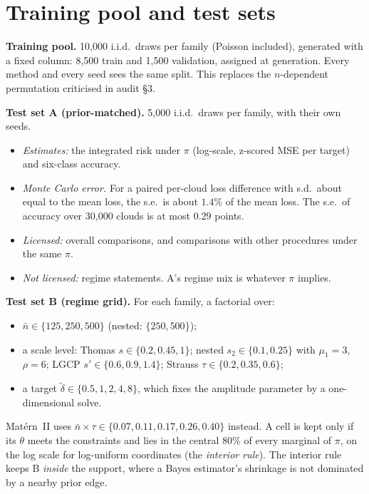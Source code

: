 \documentclass[10pt,a4paper]{article}
\newcommand{\code}[1]{\texttt{\detokenize{#1}}}
\newcommand{\nbar}{\bar n}
\newcommand{\dtil}{\tilde\delta}
\begin{document}
\section{Training pool and test sets}\label{sec:sets}

\textbf{Training pool.} 10{,}000 i.i.d.\ draws per family (Poisson included), generated with a fixed \code{split} column: 8{,}500 train and 1{,}500 validation, assigned at generation. Every method and every seed sees the same split. This replaces the $n$-dependent permutation criticised in audit \S3.

\textbf{Test set A (prior-matched).} 5{,}000 i.i.d.\ draws per family, with their own seeds.
\begin{itemize}
  \item \emph{Estimates:} the integrated risk under $\pi$ (log-scale, z-scored MSE per target) and six-class accuracy.
  \item \emph{Monte Carlo error.} For a paired per-cloud loss difference with s.d.\ about equal to the mean loss, the s.e.\ is about $1.4\%$ of the mean loss. The s.e.\ of accuracy over 30{,}000 clouds is at most $0.29$ points.
  \item \emph{Licensed:} overall comparisons, and comparisons with other procedures under the same $\pi$.
  \item \emph{Not licensed:} regime statements. A's regime mix is whatever $\pi$ implies.
\end{itemize}

\textbf{Test set B (regime grid).} For each family, a factorial over:
\begin{itemize}
  \item $\nbar\in\{125,250,500\}$ (nested: $\{250,500\}$);
  \item a scale level: Thomas $s\in\{0.2,0.45,1\}$; nested $s_2\in\{0.1,0.25\}$ with $\mu_1=3$, $\rho=6$; LGCP $s'\in\{0.6,0.9,1.4\}$; Strauss $\tau\in\{0.2,0.35,0.6\}$;
  \item a target $\dtil\in\{0.5,1,2,4,8\}$, which fixes the amplitude parameter by a one-dimensional solve.
\end{itemize}
Mat\'ern~II uses $\nbar\times\tau\in\{0.07,0.11,0.17,0.26,0.40\}$ instead. A cell is kept only if its $\theta$ meets the constraints and lies in the central 80\% of every marginal of $\pi$, on the log scale for log-uniform coordinates (the \emph{interior rule}). The interior rule keeps B \emph{inside} the support, where a Bayes estimator's shrinkage is not dominated by a nearby prior edge.
\end{document}
